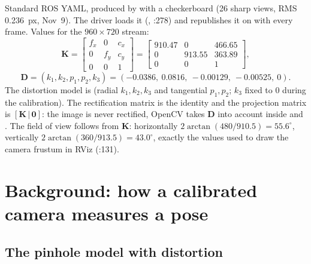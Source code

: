Standard ROS  YAML, produced by  with a checkerboard (26 sharp
views, RMS 0.236~px, Nov~9). The driver loads it (, :278) and republishes it
on  with every frame. Values for the $960\times 720$ stream:
\begin{equation}
\mathbf K = \begin{bmatrix} f_x & 0 & c_x\\ 0 & f_y & c_y\\ 0&0&1\end{bmatrix}
=\begin{bmatrix} 910.47 & 0 & 466.65\\ 0 & 913.55 & 363.89\\ 0&0&1\end{bmatrix},
\end{equation}
\begin{equation}
\mathbf D = (k_1,k_2,p_1,p_2,k_3) = (-0.0386,\ 0.0816,\ -0.00129,\ -0.00525,\ 0).
\end{equation}
The distortion model is  (radial $k_1,k_2,k_3$ and tangential $p_1,p_2$; $k_3$ fixed to 0 during the
calibration). The rectification matrix is the identity and the projection matrix is $[\mathbf K\,|\,\mathbf 0]$: the
image is never rectified, OpenCV takes $\mathbf D$ into account inside  and .
The field of view follows from $\mathbf K$: horizontally $2\arctan(480/910.5)=55.6^\circ$, vertically
$2\arctan(360/913.5)=43.0^\circ$, exactly the values used to draw the camera frustum in RViz
(:131).

\section{Background: how a calibrated camera measures a pose}

\subsection{The pinhole model with distortion}

